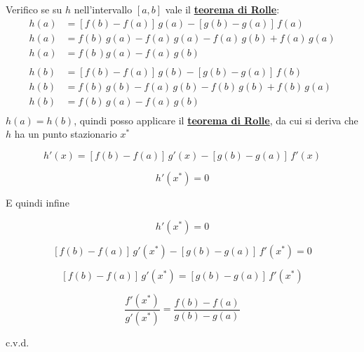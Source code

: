 \documentclass[../../dimostrazioni]{subfiles}
\begin{document}
            Verifico se su \(h\) nell'intervallo \([a,b]\) vale il \textbf{\hyperref[teoRolle]{teorema di Rolle}}:
            \begin{align*}
                h(a)&=\left[f(b) - f(a)\right] \, g(a) - \left[g(b) - g(a)\right] \, f(a)\\
                h(a)&=f(b) \, g(a) - f(a) \, g(a) - f(a) \, g(b) + f(a) \, g(a)\\
                h(a)&=f(b \, )g(a) - f(a) \, g(b)\\
                \\
                h(b)&=\left[f(b) - f(a)\right] \, g(b) - \left[g(b) - g(a)\right] \, f(b)\\
                h(b)&=f(b) \, g(b) - f(a) \, g(b) - f(b) \, g(b) + f(b) \, g(a)\\
                h(b)&=f(b) \, g(a) - f(a) \, g(b)\\
            \end{align*}
            \(h(a)=h(b)\), quindi posso applicare il \textbf{\hyperref[teoRolle]{teorema di Rolle}}, da cui si deriva che \(h\) ha un punto stazionario \(x^*\)

            \[    h'(x) = \left[f(b) - f(a)\right] \, g'(x) - \left[g(b) - g(a)\right] \, f'(x) \]
            
            \[    h'(x^*) = 0 \]

            E quindi infine

            \[  h'(x^*) = 0 \]
            
            \[  \left[f(b) - f(a)\right] \, g'(x^*) - \left[g(b) - g(a)\right] \, f'(x^*) = 0 \]

            \[  \left[f(b) - f(a)\right] \, g'(x^*) = \left[g(b) - g(a)\right] \, f'(x^*) \]
            
            \[  \frac{ f'(x^*) }{ g'(x^*) } = \frac{ f(b) - f(a) }{ g(b) - g(a) } \]
            
            c.v.d.
\end{document}
